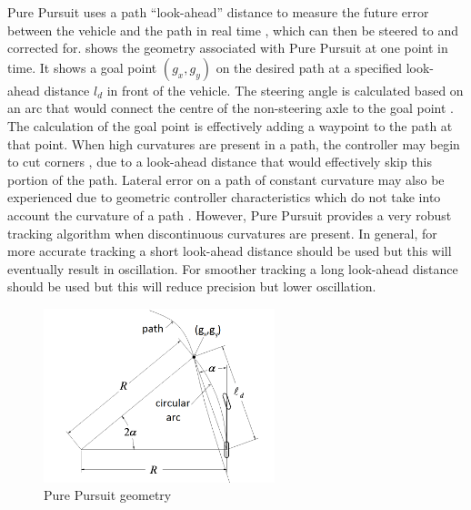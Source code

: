 \documentclass[main.tex]{subfiles}
\begin{document}
Pure Pursuit uses a path ``look-ahead'' distance to measure the future error between the vehicle and the path in real time \parencite{Lundgren2003}, which can then be steered to and corrected for.  shows the geometry associated with Pure Pursuit at one point in time. It shows a goal point $(g_x, g_y)$ on the desired path at a specified look-ahead distance $l_d$ in front of the vehicle. The steering angle is calculated based on an arc that would connect the centre of the non-steering axle to the goal point \parencite{Samuel2016}. The calculation of the goal point is effectively adding a waypoint to the path at that point. When high curvatures are present in a path, the controller may begin to cut corners \parencite{Lundgren2003}, due to a look-ahead distance that would effectively skip this portion of the path. Lateral error on a path of constant curvature may also be experienced due to geometric controller characteristics which do not take into account the curvature of a path \parencite{snider2009}. However, Pure Pursuit provides a very robust tracking algorithm when discontinuous curvatures are present. In general, for more accurate tracking a short look-ahead distance should be used \parencite{Giesbrecht2005} but this will eventually result in oscillation. For smoother tracking a long look-ahead distance should be used \parencite{Samuel2016} but this will reduce precision but lower oscillation.
\begin{figure}[ht]
\includegraphics[width=0.6\textwidth]{2-LiteratureReview/purePursuitGoal.png}
\centering
\caption[Pure Pursuit geometry]{Pure Pursuit geometry \parencite{snider2009}} 
\end{figure}

\end{document}
